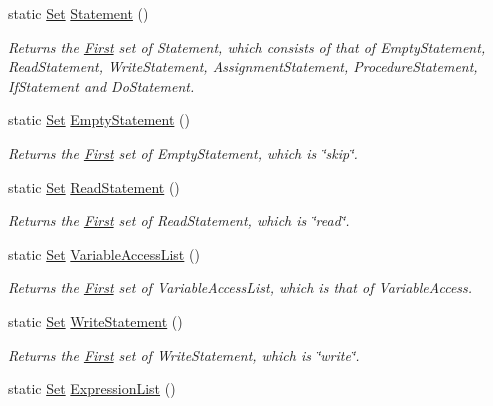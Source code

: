 \begin{DoxyCompactItemize}
static \hyperlink{classSet}{Set} \hyperlink{classFirst_aa8bb2c9262692d87abdfdf83d740e3c9}{Statement} ()
\begin{DoxyCompactList}\small\item\em Returns the \hyperlink{classFirst}{First} set of Statement, which consists of that of EmptyStatement, ReadStatement, WriteStatement, AssignmentStatement, ProcedureStatement, IfStatement and DoStatement. \item\end{DoxyCompactList}\item 
static \hyperlink{classSet}{Set} \hyperlink{classFirst_a0b4acc2ad6d1f2f8f8d3b1ec984431bf}{EmptyStatement} ()
\begin{DoxyCompactList}\small\item\em Returns the \hyperlink{classFirst}{First} set of EmptyStatement, which is \char`\"{}skip\char`\"{}. \item\end{DoxyCompactList}\item 
static \hyperlink{classSet}{Set} \hyperlink{classFirst_a88b0ba44671efe5d4838fa80cbc663fd}{ReadStatement} ()
\begin{DoxyCompactList}\small\item\em Returns the \hyperlink{classFirst}{First} set of ReadStatement, which is \char`\"{}read\char`\"{}. \item\end{DoxyCompactList}\item 
static \hyperlink{classSet}{Set} \hyperlink{classFirst_aaa47b4e29fb5ab9df531b490bc954dcd}{VariableAccessList} ()
\begin{DoxyCompactList}\small\item\em Returns the \hyperlink{classFirst}{First} set of VariableAccessList, which is that of VariableAccess. \item\end{DoxyCompactList}\item 
static \hyperlink{classSet}{Set} \hyperlink{classFirst_ab293c9f0bd36e9696dcb336391df35a4}{WriteStatement} ()
\begin{DoxyCompactList}\small\item\em Returns the \hyperlink{classFirst}{First} set of WriteStatement, which is \char`\"{}write\char`\"{}. \item\end{DoxyCompactList}\item 
static \hyperlink{classSet}{Set} \hyperlink{classFirst_af4783dc02b3360e5f1f3576aa241bc0e}{ExpressionList} ()

\end{DoxyCompactItemize}

